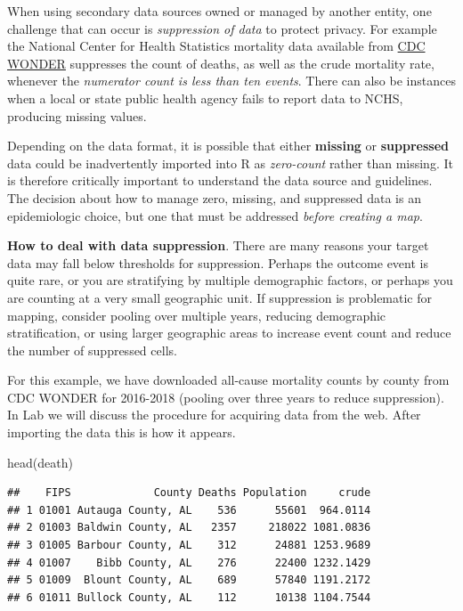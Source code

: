 \documentclass[
]{book}
\newenvironment{Shaded}{\begin{snugshade}}{\end{snugshade}}
\newcommand{\FunctionTok}[1]{\textcolor[rgb]{0.00,0.00,0.00}{#1}}
\newcommand{\NormalTok}[1]{#1}
\newenvironment{rmdcaution}[1]
  {
  \begin{itemize}
  \renewcommand{\labelitemi}{
    \raisebox{-.7\height}[0pt][0pt]{
      {\setkeys{Gin}{width=3em,keepaspectratio}\texttt{[image: images/\#1]}}
    }
  }
  \setlength{\fboxsep}{1em}
  \begin{caution}
  \item
  }
  {
  \end{caution}
  \end{itemize}
  }
\newenvironment{rmdtip}[1]
  {
  \begin{itemize}
  \renewcommand{\labelitemi}{
    \raisebox{-.7\height}[0pt][0pt]{
      {\setkeys{Gin}{width=3em,keepaspectratio}\texttt{[image: images/\#1]}}
    }
  }
  \setlength{\fboxsep}{1em}
  \begin{tip}
  \item
  }
  {
  \end{tip}
  \end{itemize}
  }
\begin{document}
When using secondary data sources owned or managed by another entity, one challenge that can occur is \emph{suppression of data} to protect privacy. For example the National Center for Health Statistics mortality data available from \href{https://wonder.cdc.gov/}{CDC WONDER} suppresses the count of deaths, as well as the crude mortality rate, whenever the \emph{numerator count is less than ten events}. There can also be instances when a local or state public health agency fails to report data to NCHS, producing missing values.

\begin{rmdcaution}{caution}
Depending on the data format, it is possible that either \textbf{missing} or \textbf{suppressed} data could be inadvertently imported into R as \emph{zero-count} rather than missing. It is therefore critically important to understand the data source and guidelines. The decision about how to manage zero, missing, and suppressed data is an epidemiologic choice, but one that must be addressed \emph{before creating a map}.

\end{rmdcaution}

\begin{rmdtip}{tip}
\textbf{How to deal with data suppression}. There are many reasons your target data may fall below thresholds for suppression. Perhaps the outcome event is quite rare, or you are stratifying by multiple demographic factors, or perhaps you are counting at a very small geographic unit. If suppression is problematic for mapping, consider pooling over multiple years, reducing demographic stratification, or using larger geographic areas to increase event count and reduce the number of suppressed cells.

\end{rmdtip}

For this example, we have downloaded all-cause mortality counts by county from CDC WONDER for 2016-2018 (pooling over three years to reduce suppression). In Lab we will discuss the procedure for acquiring data from the web. After importing the data this is how it appears.

\begin{Shaded}
\begin{Highlighting}[]
\FunctionTok{head}\NormalTok{(death)}
\end{Highlighting}
\end{Shaded}

\begin{verbatim}
##    FIPS             County Deaths Population     crude
## 1 01001 Autauga County, AL    536      55601  964.0114
## 2 01003 Baldwin County, AL   2357     218022 1081.0836
## 3 01005 Barbour County, AL    312      24881 1253.9689
## 4 01007    Bibb County, AL    276      22400 1232.1429
## 5 01009  Blount County, AL    689      57840 1191.2172
## 6 01011 Bullock County, AL    112      10138 1104.7544
\end{verbatim}
\end{document}
